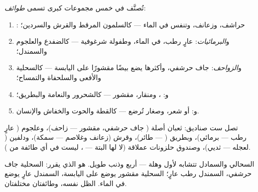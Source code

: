 \begin{proposition}\label{prop:g4:classifying-animals:classes}
تُصنَّف  في خمس مجموعات كبرى تسمى
\emph{طوائف}:
\begin{enumerate}
  \item \emph{}: حراشف، وزعانف، وتنفس في الماء --- كالسلمون
        المرقط والقرش والسردين؛
  \item و\emph{البرمائيات}:  عارٍ رطب،  في
        الماء، وطفولة شرغوفية --- كالضفدع والعلجوم والسمندل؛
  \item و\emph{الزواحف}:  جاف حرشفي، وأكثرها يضع
        بيضًا مقشورًا على اليابسة --- كالسحلية والأفعى والسلحفاة
        والتمساح؛
  \item و\emph{}: ، ومنقار،  مقشور --- كالشحرور
        والنعامة والبطريق؛
  \item و\emph{}:  أو شعر، وصغار تُرضع  ---
        كالقطة والحوت والخفاش والإنسان.
\end{enumerate}
\end{proposition}
\admitted

\begin{example}\label{ex:g4:classifying-animals:zoo}
تصل ست صناديق: ثعبان أصلة ( جاف حرشفي،  مقشور --- زاحف)،
وعلجوم ( عارٍ رطب --- برمائي)، وبطريق ( --- طائر)، وقرش
(زعانف وغلاصم --- سمكة)، ودلفين ( لعجله --- ثديي)، وصندوق
حلزونات عملاقة (لا  لها البتة --- ، ليست في أي
طائفة من ).
\end{example}

\begin{remark}\label{rem:g4:classifying-animals:confusion}
السحالي والسمادل تتشابه لأول وهلة --- أربع  وذنب طويل. 
هو الذي يقرر:  السحلية جاف حرشفي،  السمندل رطب عارٍ؛ 
السحلية مقشور يوضع على اليابسة،  السمندل عارٍ يوضع في الماء.
الظل نفسه، وطائفتان مختلفتان.
\end{remark}

